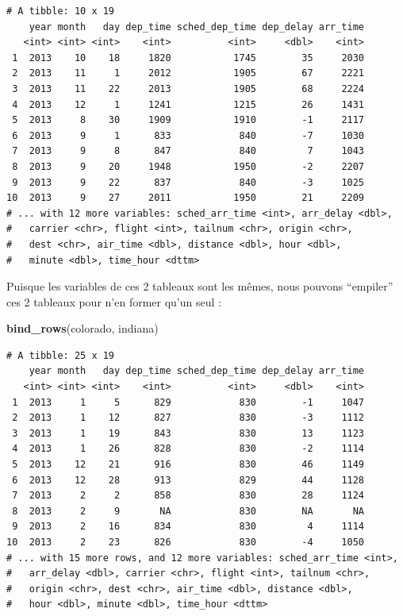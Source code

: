 \documentclass[a4paperpaper,]{article}
\newenvironment{Shaded}{\begin{snugshade}}{\end{snugshade}}
\newcommand{\KeywordTok}[1]{\textcolor[rgb]{0.12,0.11,0.11}{\textbf{#1}}}
\newcommand{\NormalTok}[1]{\textcolor[rgb]{0.12,0.11,0.11}{#1}}
\begin{document}
\begin{verbatim}
# A tibble: 10 x 19
    year month   day dep_time sched_dep_time dep_delay arr_time
   <int> <int> <int>    <int>          <int>     <dbl>    <int>
 1  2013    10    18     1820           1745        35     2030
 2  2013    11     1     2012           1905        67     2221
 3  2013    11    22     2013           1905        68     2224
 4  2013    12     1     1241           1215        26     1431
 5  2013     8    30     1909           1910        -1     2117
 6  2013     9     1      833            840        -7     1030
 7  2013     9     8      847            840         7     1043
 8  2013     9    20     1948           1950        -2     2207
 9  2013     9    22      837            840        -3     1025
10  2013     9    27     2011           1950        21     2209
# ... with 12 more variables: sched_arr_time <int>, arr_delay <dbl>,
#   carrier <chr>, flight <int>, tailnum <chr>, origin <chr>,
#   dest <chr>, air_time <dbl>, distance <dbl>, hour <dbl>,
#   minute <dbl>, time_hour <dttm>
\end{verbatim}

Puisque les variables de ces 2 tableaux sont les mêmes, nous pouvons ``empiler'' ces 2 tableaux pour n'en former qu'un seul :

\begin{Shaded}
\begin{Highlighting}[]
\KeywordTok{bind_rows}\NormalTok{(colorado, indiana)}
\end{Highlighting}
\end{Shaded}

\begin{verbatim}
# A tibble: 25 x 19
    year month   day dep_time sched_dep_time dep_delay arr_time
   <int> <int> <int>    <int>          <int>     <dbl>    <int>
 1  2013     1     5      829            830        -1     1047
 2  2013     1    12      827            830        -3     1112
 3  2013     1    19      843            830        13     1123
 4  2013     1    26      828            830        -2     1114
 5  2013    12    21      916            830        46     1149
 6  2013    12    28      913            829        44     1128
 7  2013     2     2      858            830        28     1124
 8  2013     2     9       NA            830        NA       NA
 9  2013     2    16      834            830         4     1114
10  2013     2    23      826            830        -4     1050
# ... with 15 more rows, and 12 more variables: sched_arr_time <int>,
#   arr_delay <dbl>, carrier <chr>, flight <int>, tailnum <chr>,
#   origin <chr>, dest <chr>, air_time <dbl>, distance <dbl>,
#   hour <dbl>, minute <dbl>, time_hour <dttm>
\end{verbatim}
\end{document}

